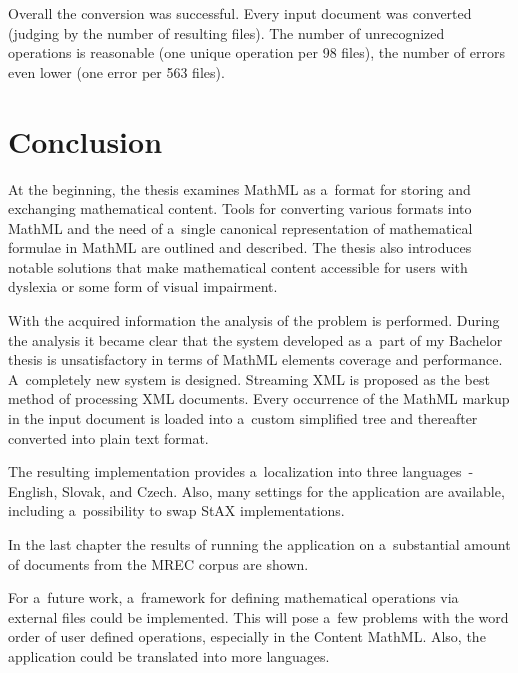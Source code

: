 \documentclass[11pt,oneside,final]{fithesis2}
\def\s#1{#1\index{#1}}
\begin{document}
Overall the conversion was successful. Every input document was converted (judging by the number of resulting files). The number of unrecognized operations is reasonable (one unique operation per 98 files), the number of errors even lower (one error per 563 files).

\chapter{Conclusion}
At the beginning, the thesis examines \s{MathML} as a~format for storing and exchanging mathematical content. Tools for converting various formats into MathML and the need of a~single canonical representation of mathematical formulae in MathML are outlined and described. The thesis also introduces notable solutions that make mathematical content accessible for users with dyslexia or some form of visual impairment. 

With the acquired information the analysis of the problem is performed. During the analysis it became clear that the system developed as a~part of my Bachelor thesis is unsatisfactory in terms of MathML elements coverage and performance. A~completely new system is designed. Streaming XML is proposed as the best method of processing XML documents. Every occurrence of the MathML markup in the input document is loaded into a~custom simplified tree and thereafter converted into plain text format. 

The resulting implementation provides a~localization into three languages~- English, Slovak, and Czech. Also, many settings for the application are available, including a~possibility to swap \s{StAX} implementations.  

In the last chapter the results of running the application on a~substantial amount of documents from the MREC corpus are shown. 

For a~future work, a~framework for defining mathematical operations via external files could be implemented. This will pose a~few problems with the word order of user defined operations, especially in the Content MathML. Also, the application could be translated into more languages. 

\clearpage
{}



\appendix
\end{document}
